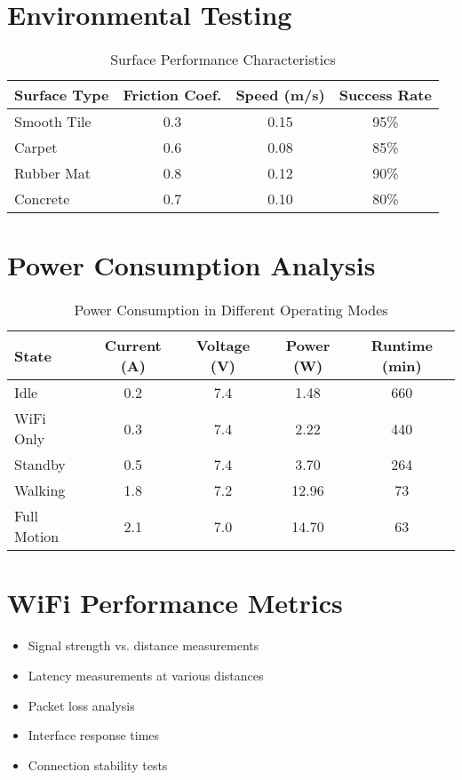 \documentclass[12pt,a4paper]{report}
\begin{document}
\section{Environmental Testing}
\begin{table}[h]
\centering
\begin{tabular}{|l|c|c|c|}
\hline
\textbf{Surface Type} & \textbf{Friction Coef.} & \textbf{Speed (m/s)} & \textbf{Success Rate} \\
\hline
Smooth Tile & 0.3 & 0.15 & 95\% \\
Carpet & 0.6 & 0.08 & 85\% \\
Rubber Mat & 0.8 & 0.12 & 90\% \\
Concrete & 0.7 & 0.10 & 80\% \\
\hline
\end{tabular}
\caption{Surface Performance Characteristics}
\end{table}

\section{Power Consumption Analysis}
\begin{table}[h]
\centering
\begin{tabular}{|l|c|c|c|c|}
\hline
\textbf{State} & \textbf{Current (A)} & \textbf{Voltage (V)} & \textbf{Power (W)} & \textbf{Runtime (min)} \\
\hline
Idle & 0.2 & 7.4 & 1.48 & 660 \\
WiFi Only & 0.3 & 7.4 & 2.22 & 440 \\
Standby & 0.5 & 7.4 & 3.70 & 264 \\
Walking & 1.8 & 7.2 & 12.96 & 73 \\
Full Motion & 2.1 & 7.0 & 14.70 & 63 \\
\hline
\end{tabular}
\caption{Power Consumption in Different Operating Modes}
\end{table}
\section{WiFi Performance Metrics}
\begin{itemize}
\item Signal strength vs. distance measurements
\item Latency measurements at various distances
\item Packet loss analysis
\item Interface response times
\item Connection stability tests
\end{itemize}
\end{document}
